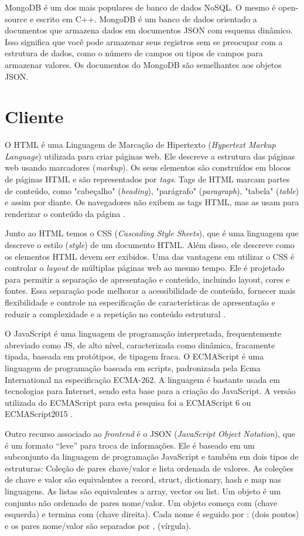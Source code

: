 MongoDB é um dos mais populares de banco de dados NoSQL. O mesmo é open-source e escrito em C++.
MongoDB é um banco de dados orientado a documentos que armazena dados em documentos JSON com esquema dinâmico. Isso significa que você pode armazenar seus registros sem se preocupar com a estrutura de dados, como o número de campos ou tipos de campos para armazenar valores. Os documentos do MongoDB são semelhantes aos objetos JSON.

\section{Cliente}

O HTML é uma Linguagem de Marcação de Hipertexto (\textit{Hypertext Markup Language}) utilizada para criar páginas web. Ele descreve a estrutura das páginas web usando marcadores (\textit{markup}). Os seus elementos são construídos em blocos de páginas HTML e são representados por \textit{tags}. Tags de HTML marcam partes de conteúdo, como "cabeçalho" (\textit{heading}), "parágrafo" (\textit{paragraph}), "tabela" (\textit{table}) e assim por diante. Os navegadores não exibem as tags HTML, mas as usam para renderizar o conteúdo da página \cite{html}.

 Junto ao HTML temos o CSS (\textit{Cascading Style Sheets}), que é uma linguagem que descreve o estilo (\textit{style}) de um documento HTML. Além disso, ele descreve como os elementos HTML devem ser exibidos. Uma das vantagens em utilizar o CSS é controlar o \textit{layout} de múltiplas páginas web ao mesmo tempo. Ele é projetado para permitir a separação de apresentação e conteúdo, incluindo layout, cores e fontes. Essa separação pode melhorar a acessibilidade de conteúdo, fornecer mais flexibilidade e controle na especificação de características de apresentação e reduzir a complexidade e a repetição no conteúdo estrutural \cite{css}.

O JavaScript é uma linguagem de programação interpretada, frequentemente abreviado como JS, de alto nível, caracterizada como dinâmica, fracamente tipada, baseada em protótipos, de tipagem fraca.
O ECMAScript é uma linguagem de programação baseada em scripts, padronizada pela Ecma International na especificação ECMA-262. A linguagem é bastante usada em tecnologias para Internet, sendo esta base para a criação do JavaScript. A versão utilizada do ECMAScript para esta pesquisa foi a ECMAScript 6 ou ECMAScript2015 \cite{ecma2015}.

Outro recurso associado ao \textit{frontend} é o JSON (\textit{JavaScript Object Notation}), que é um formato “leve” para troca de informações. Ele é baseado em um subconjunto da linguagem de programação JavaScript  \cite{json} e também em dois tipos de estruturas: Coleção de pares chave/valor e lista ordenada de valores. As coleções de chave e valor são equivalentes a record, struct, dictionary, hash e map nas linguagens. As listas são equivalentes a array, vector ou list.
Um objeto é um conjunto não ordenado de pares nome/valor. Um objeto começa com { (chave esquerda) e termina com } (chave direita). Cada nome é seguido por : (dois pontos) e os pares nome/valor são separados por , (vírgula).

